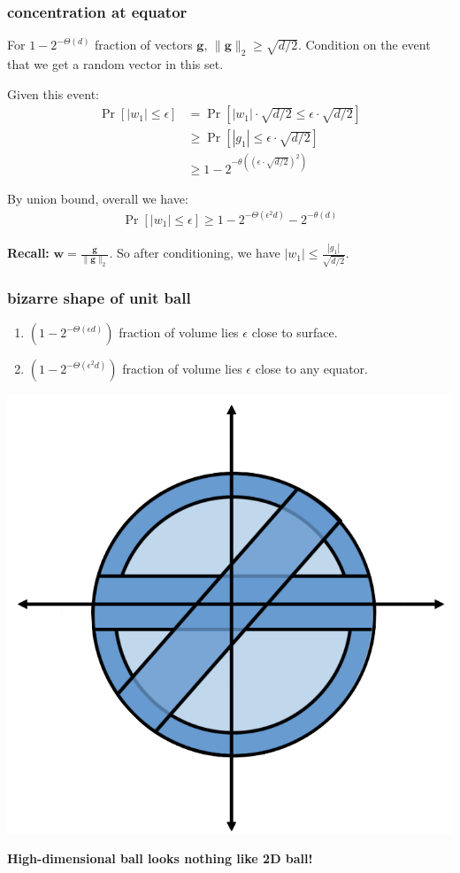 \documentclass[compress]{beamer}
\newcommand{\bv}[1]{\mathbf{#1}}
\begin{document}
\begin{frame}[t]
	\frametitle{concentration at equator}
	For $1 - 2^{-\Theta(d)}$ fraction of vectors $\bv{g}$, $\|\bv{g}\|_2 \geq \sqrt{d/2}$. Condition on the event that we get a random vector in this set. 
	
	Given this event:
	\begin{align*}
	\Pr\left[|{w}_1| \leq \epsilon\right] &= \Pr\left[|{w}_1|\cdot\sqrt{d/2} \leq \epsilon\cdot \sqrt{d/2} \right]\\ &\geq \Pr\left[|g_1| \leq \epsilon\cdot \sqrt{d/2} \right]\\
	&\geq 1 - 2^{-\theta\left((\epsilon\cdot \sqrt{d/2})^2\right)}
	\end{align*}

	By union bound, overall we have:
	\begin{align*}
		\Pr\left[|{w}_1| \leq \epsilon\right] \geq 1 - 2^{-\Theta\left(\epsilon^2d\right)} - 2^{-\theta(d)}
	\end{align*}

\vspace{1em}
	\textbf{Recall:} $\bv{w} = \frac{\bv{g}}{\|\bv{g}\|_2}$. So after conditioning, we have $|{w}_1| \leq \frac{|{g}_1|}{\sqrt{d/2}}$. 
\end{frame}

\begin{frame}[t]
	\frametitle{bizarre shape of unit ball}
	\begin{enumerate}
		\item $(1 -2^{-\Theta(\epsilon d)})$ fraction of volume lies $\epsilon$ close to surface. 
		\item $(1 - 2^{-\Theta(\epsilon^2 d)})$ fraction of volume lies $\epsilon$ close to any equator. 
	\end{enumerate}
	
	\begin{center}
		\includegraphics[width=.5\textwidth]{equators_surface.png}
		
		\alert{\textbf{High-dimensional ball looks nothing like 2D ball!}} 
	\end{center}
\end{frame}
\end{document}
